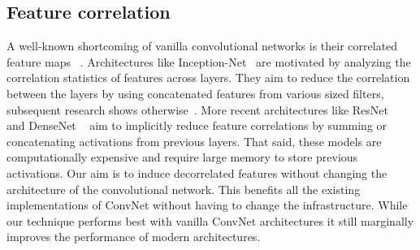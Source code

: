 \subsection{Feature correlation } 
A well-known shortcoming of vanilla convolutional networks is their correlated feature maps ~\cite{Cogswell2015ReducingOI, Glorot2010UnderstandingTD}.
Architectures like Inception-Net~\cite{Szegedy2015GoingDW} are motivated by analyzing the correlation statistics of features across layers.
They aim to reduce the correlation between the layers by using concatenated features from various sized filters, subsequent research shows otherwise~\cite{Raghu2017SVCCASV}.
More recent architectures like ResNet~\cite{He2016DeepRL} and DenseNet ~\cite{Huang2017DenselyCC} aim to implicitly reduce feature correlations by summing or concatenating activations from previous layers.
That said, these models are computationally expensive and require large memory to store previous activations.
Our aim is to induce decorrelated features without changing the architecture of the convolutional network.
This benefits all the existing implementations of ConvNet without having to change the infrastructure.
While our technique performs best with vanilla ConvNet architectures it still marginally improves the performance of modern architectures.

